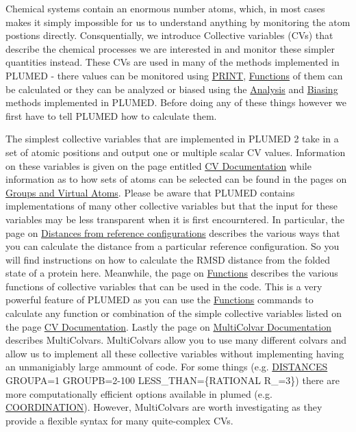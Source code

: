 Chemical systems contain an enormous number atoms, which, in most cases makes it simply impossible for us to understand anything by monitoring the atom postions directly. Consquentially, we introduce Collective variables (C\+Vs) that describe the chemical processes we are interested in and monitor these simpler quantities instead. These C\+Vs are used in many of the methods implemented in P\+L\+U\+M\+E\+D -\/ there values can be monitored using \hyperlink{PRINT}{P\+R\+I\+N\+T}, \hyperlink{Function}{Functions} of them can be calculated or they can be analyzed or biased using the \hyperlink{_analysis}{Analysis} and \hyperlink{_bias}{Biasing} methods implemented in P\+L\+U\+M\+E\+D. Before doing any of these things however we first have to tell P\+L\+U\+M\+E\+D how to calculate them.

The simplest collective variables that are implemented in P\+L\+U\+M\+E\+D 2 take in a set of atomic positions and output one or multiple scalar C\+V values. Information on these variables is given on the page entitled \hyperlink{Colvar}{C\+V Documentation} while information as to how sets of atoms can be selected can be found in the pages on \hyperlink{Group}{Groups and Virtual Atoms}. Please be aware that P\+L\+U\+M\+E\+D contains implementations of many other collective variables but that the input for these variables may be less transparent when it is first encourntered. In particular, the page on \hyperlink{dists}{Distances from reference configurations} describes the various ways that you can calculate the distance from a particular reference configuration. So you will find instructions on how to calculate the R\+M\+S\+D distance from the folded state of a protein here. Meanwhile, the page on \hyperlink{Function}{Functions} describes the various functions of collective variables that can be used in the code. This is a very powerful feature of P\+L\+U\+M\+E\+D as you can use the \hyperlink{Function}{Functions} commands to calculate any function or combination of the simple collective variables listed on the page \hyperlink{Colvar}{C\+V Documentation}. Lastly the page on \hyperlink{mcolv}{Multi\+Colvar Documentation} describes Multi\+Colvars. Multi\+Colvars allow you to use many different colvars and allow us to implement all these collective variables without implementing having an unmanigiably large ammount of code. For some things (e.\+g. \hyperlink{DISTANCES}{D\+I\+S\+T\+A\+N\+C\+E\+S} G\+R\+O\+U\+P\+A=1 G\+R\+O\+U\+P\+B=2-\/100 L\+E\+S\+S\+\_\+\+T\+H\+A\+N=\{R\+A\+T\+I\+O\+N\+A\+L R\+\_=3\}) there are more computationally efficient options available in plumed (e.\+g. \hyperlink{COORDINATION}{C\+O\+O\+R\+D\+I\+N\+A\+T\+I\+O\+N}). However, Multi\+Colvars are worth investigating as they provide a flexible syntax for many quite-\/complex C\+Vs.


